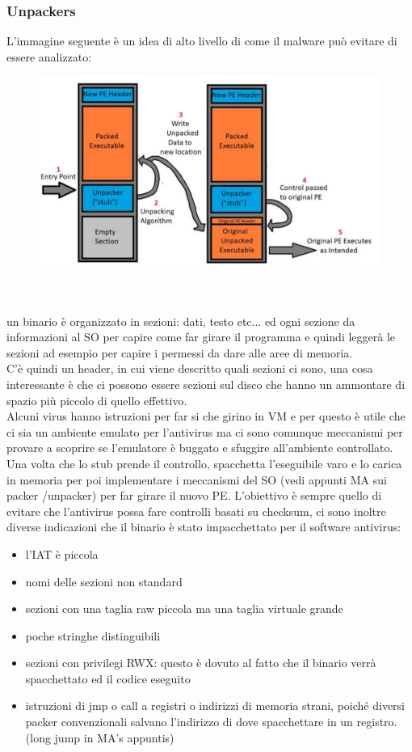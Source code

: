 \documentclass[12pt, oneside]{extbook} %
\begin{document}
\subsubsection{Unpackers}
L'immagine seguente è un idea di alto livello di come il malware può evitare di essere analizzato:\\
\begin{figure}[!h]
	\includegraphics[scale=0.3]{immagini/unpacker.png}
\end{figure}\\\\
un binario è organizzato in sezioni: dati, testo etc... ed ogni sezione da informazioni al SO per capire come far girare il programma e quindi leggerà le sezioni ad esempio per capire i permessi da dare alle aree di memoria.\\C'è quindi un header, in cui viene descritto quali sezioni ci sono, una cosa interessante è che ci possono essere sezioni sul disco che hanno un ammontare di spazio più piccolo di quello effettivo.\\Alcuni virus hanno istruzioni per far si che girino in VM e per questo è utile che ci sia un ambiente emulato per l'antivirus ma ci sono comunque meccanismi per provare a scoprire se l'emulatore è buggato e sfuggire all'ambiente controllato.\\Una volta che lo stub prende il controllo, spacchetta l'eseguibile varo e lo carica in memoria per poi implementare i meccanismi del SO (vedi appunti MA sui packer /unpacker) per far girare il nuovo PE. L'obiettivo è sempre quello di evitare che l'antivirus possa fare controlli basati su checksum, ci sono inoltre diverse indicazioni che il binario è stato impacchettato per il software antivirus:
\begin{itemize}
\item l'IAT è piccola
\item nomi delle sezioni non standard
\item sezioni con una taglia raw piccola ma una taglia virtuale grande
\item poche stringhe distinguibili
\item sezioni con privilegi RWX: questo è dovuto al fatto che il binario verrà spacchettato ed il codice eseguito
\item istruzioni di jmp o call a registri o indirizzi di memoria strani, poiché diversi packer convenzionali salvano l'indirizzo di dove spacchettare in un registro. (long jump in MA's appuntis)
\end{itemize}
\end{document}
